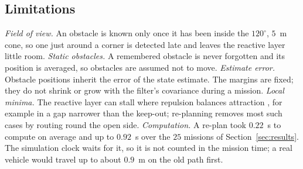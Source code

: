 \subsection{Limitations}
\textit{Field of view.} An obstacle is known only once it has been
inside the $120^{\circ}$, $5$~m cone, so one just around a corner is
detected late and leaves the reactive layer little room.
\textit{Static obstacles.} A remembered obstacle is never forgotten and
its position is averaged, so obstacles are assumed not to move.
\textit{Estimate error.} Obstacle positions inherit the error of the
state estimate. The margins are fixed; they do not
shrink or grow with the filter's covariance during a mission. \textit{Local minima.} The reactive layer can stall where
repulsion balances attraction \cite{szczepanski2022}, for example in a gap narrower than the
keep-out; re-planning removes most such cases by routing round the open
side. \textit{Computation.} A re-plan took $0.22$~s to compute on
average and up to $0.92$~s over the $25$ missions of
Section~\ref{sec:results}. The simulation clock waits for it, so it is
not counted in the mission time; a real vehicle would travel up to
about $0.9$~m on the old path first.
